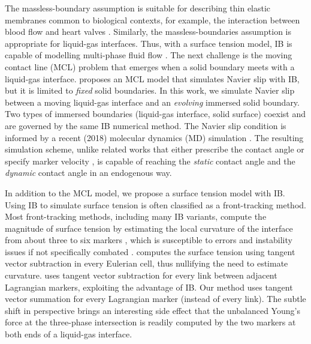 \documentclass{jfm}
\begin{document}
The massless-boundary assumption is suitable for describing thin elastic membranes common to biological contexts, for example, the interaction between blood flow and heart valves \citep{peskin1972flow}. Similarly, the massless-boundaries assumption is appropriate for liquid-gas interfaces. Thus, with a surface tension model, IB is capable of modelling multi-phase fluid flow \citep{surface_tension_review, surface_tension_IB_estimates_curvature, multi_phase_2018, assessment_VOF_vs_IB}. The next challenge is the moving contact line (MCL) problem that emerges when a solid boundary meets with a liquid-gas interface. \cite{MCL_IBM_surfactant} proposes an MCL model that simulates Navier slip with IB, but it is limited to \textit{fixed} solid boundaries. In this work, we simulate Navier slip between a moving liquid-gas interface and an \textit{evolving} immersed solid boundary. Two types of immersed boundaries (liquid-gas interface, solid surface) coexist and are governed by the same IB numerical method. The Navier slip condition is informed by a recent (2018) molecular dynamics (MD) simulation \citep{MD_2018_its_the_bonds}. The resulting simulation scheme, unlike related works that either prescribe the contact angle \citep{curved_solid_DI_IB, muradoglu2010front} or specify marker velocity \citep{manservisi2009variational}, is capable of reaching the \textit{static} contact angle and the \textit{dynamic} contact angle in an endogenous way. 

In addition to the MCL model, we propose a surface tension model with IB. Using IB to simulate surface tension is often classified as a front-tracking method. Most front-tracking methods, including many IB variants, compute the magnitude of surface tension by estimating the local curvature of the interface from about three to six markers \citep{surface_tension_IB_estimates_curvature, multi_phase_2018}, which is susceptible to errors and instability issues if not specifically combated \citep{assessment_VOF_vs_IB}. \cite{surface_tension_still_tangent_applied_to_segment} computes the surface tension using tangent vector subtraction in every Eulerian cell, thus nullifying the need to estimate curvature. \cite{eulerian_tension_lagrangian_advection} uses tangent vector subtraction for every link between adjacent Lagrangian markers, exploiting the advantage of IB. Our method uses tangent vector summation for every Lagrangian marker (instead of every link). The subtle shift in perspective brings an interesting side effect that the unbalanced Young's force at the three-phase intersection is readily computed by the two markers at both ends of a liquid-gas interface. 
\end{document}
